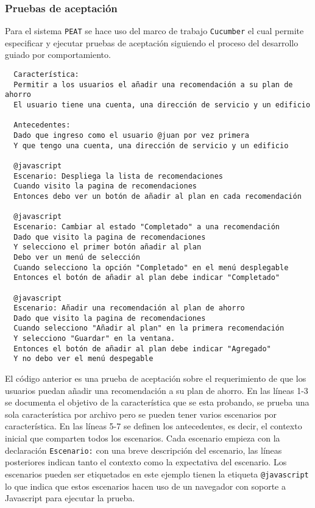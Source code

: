 \subsubsection{Pruebas de aceptación}

Para el sistema \texttt{PEAT} se hace uso del marco de trabajo \texttt{Cucumber}
el cual permite especificar y ejecutar pruebas de aceptación siguiendo el proceso
del desarrollo guiado por comportamiento.

\begin{lstlisting}
  Característica:
  Permitir a los usuarios el añadir una recomendación a su plan de ahorro
  El usuario tiene una cuenta, una dirección de servicio y un edificio

  Antecedentes:
  Dado que ingreso como el usuario @juan por vez primera
  Y que tengo una cuenta, una dirección de servicio y un edificio

  @javascript
  Escenario: Despliega la lista de recomendaciones
  Cuando visito la pagina de recomendaciones
  Entonces debo ver un botón de añadir al plan en cada recomendación

  @javascript
  Escenario: Cambiar al estado "Completado" a una recomendación
  Dado que visito la pagina de recomendaciones
  Y selecciono el primer botón añadir al plan
  Debo ver un menú de selección
  Cuando selecciono la opción "Completado" en el menú desplegable
  Entonces el botón de añadir al plan debe indicar "Completado"

  @javascript
  Escenario: Añadir una recomendación al plan de ahorro
  Dado que visito la pagina de recomendaciones
  Cuando selecciono "Añadir al plan" en la primera recomendación
  Y selecciono "Guardar" en la ventana.
  Entonces el botón de añadir al plan debe indicar "Agregado"
  Y no debo ver el menú despegable
\end{lstlisting}

El código anterior es una prueba de aceptación sobre el requerimiento de que los
usuarios puedan añadir una recomendación a su plan de ahorro.
En las líneas 1-3 se documenta el objetivo de la característica que se esta
probando, se prueba una sola característica por archivo pero se pueden tener
varios escenarios por característica. En las líneas 5-7 se definen
los antecedentes, es decir, el contexto inicial que comparten todos los
escenarios. Cada escenario empieza con la declaración \texttt{Escenario:}
con una breve descripción del escenario, las líneas posteriores indican
tanto el contexto como la expectativa del escenario. Los escenarios
pueden ser etiquetados en este ejemplo tienen la etiqueta \texttt{@javascript}
lo que indica que estos escenarios hacen uso de un navegador con soporte
a Javascript para ejecutar la prueba.


